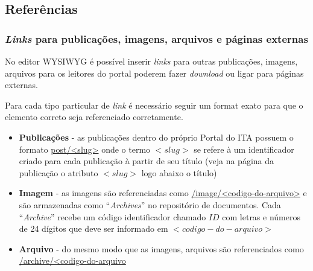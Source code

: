 \subsection{Referências}


\subsubsection{\textit{Links} para publicações, imagens, arquivos e páginas externas}

No editor \gls{WYSIWYG} é possível inserir \textit{links} para outras publicações, imagens, arquivos para os leitores do portal poderem fazer \textit{download} ou ligar para páginas externas.

Para cada tipo particular de \textit{link} é necessário seguir um format exato para que o elemento correto seja referenciado corretamente.

\begin{itemize}
    \item \textbf{Publicações} - as publicações dentro do próprio Portal do ITA possuem o formato \href{}{post/<slug>} onde o termo $<slug>$ se refere à um identificador criado para cada publicação à partir de seu título (veja na página da publicação o atributo $<slug>$ logo abaixo o título)
    \item \textbf{Imagem} - as imagens são referenciadas como \href{}{/image/<codigo-do-arquivo>} e são armazenadas como ``\textit{Archives}'' no repositório de documentos. Cada ``\textit{Archive}'' recebe um código identificador chamado $ID$ com letras e números de 24 dígitos que deve ser informado em $<codigo-do-arquivo>$
    \item \textbf{Arquivo} - do mesmo modo que as imagens, arquivos são referenciados como \href{}{/archive/<codigo-do-arquivo}
\end{itemize}